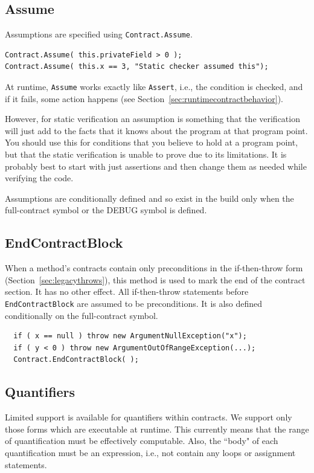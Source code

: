 \documentclass{article}
\newcommand{\code}[1]{\lstinline{#1}}
\begin{document}
\subsection{Assume}
Assumptions are specified using \code{Contract.Assume}.
\begin{lstlisting}
Contract.Assume( this.privateField > 0 );
Contract.Assume( this.x == 3, "Static checker assumed this");
\end{lstlisting}
At runtime, \code{Assume} works exactly like \code{Assert}, i.e., the
condition is checked, and if it fails, some action happens (see
Section~\ref{sec:runtimecontractbehavior}).

However, for static verification an assumption is something
that the verification will just add to the facts that it knows about
the program at that program point. You should use this for conditions
that you believe to hold at a program point, but that the static
verification is unable to prove due to its limitations. It is probably
best to start with just assertions and then change them as needed
while verifying the code. 

Assumptions are conditionally defined and so exist in the build only
when the full-contract symbol or the DEBUG symbol is defined.  

\subsection{EndContractBlock}
\label{sec:endcontractblock}
When a method's contracts contain only preconditions in the
if-then-throw form (Section~\ref{sec:legacythrows}), this method is
used to mark the end of the contract section. It has no other effect. All if-then-throw
statements before \code{EndContractBlock} are assumed to be preconditions.
It is also defined conditionally on the full-contract symbol.
\begin{lstlisting}
  if ( x == null ) throw new ArgumentNullException("x");
  if ( y < 0 ) throw new ArgumentOutOfRangeException(...);
  Contract.EndContractBlock( );
\end{lstlisting}

\subsection{Quantifiers}
\label{sec:quantifiers}
Limited support is available for quantifiers within
contracts. We support only those forms which are executable at
runtime. This currently means that the range of quantification must be
effectively computable.
Also, the ``body" of each quantification must be an expression,
i.e., not contain any loops or assignment statements.  
\end{document}
